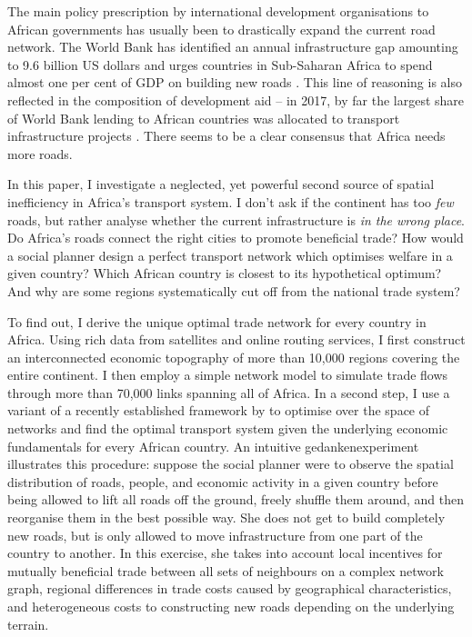 \documentclass[11pt, oneside]{article}   	%
\begin{document}
The main policy prescription by international development organisations to African governments has usually been to drastically expand the current road network. The World Bank has identified an annual infrastructure gap amounting to 9.6 billion US dollars and urges countries in Sub-Saharan Africa to spend almost one per cent of GDP on building new roads \citep{Foster_AfricaInfrastructureTime_2010}. This line of reasoning is also reflected in the composition of development aid -- in 2017, by far the largest share of World Bank lending to African countries was allocated to transport infrastructure projects \citep{TheWorldBank_WorldBankAnnual_2017}. There seems to be a clear consensus that Africa needs more roads.

In this paper, I investigate a neglected, yet powerful second source of spatial inefficiency in Africa's transport system. I don't ask if the continent has too \emph{few} roads, but rather analyse whether the current infrastructure is \emph{in the wrong place}. Do Africa's roads connect the right cities to promote beneficial trade? How would a social planner design a perfect transport network which optimises welfare in a given country? Which African country is closest to its hypothetical optimum? And why are some regions systematically cut off from the national trade system?

To find out, I derive the unique optimal trade network for every country in Africa. Using rich data from satellites and online routing services, I first construct an interconnected economic topography of more than 10,000 regions covering the entire continent. I then employ a simple network model to simulate trade flows through more than 70,000 links spanning all of Africa. In a second step, I use a variant of a recently established framework by \cite{fajgelbaum_optimal_2017} to optimise over the space of networks and find the optimal transport system given the underlying economic fundamentals for every African country. An intuitive gedankenexperiment illustrates this procedure: suppose the social planner were to observe the spatial distribution of roads, people, and economic activity in a given country before being allowed to lift all roads off the ground, freely shuffle them around, and then reorganise them in the best possible way. She does not get to build completely new roads, but is only allowed to move infrastructure from one part of the country to another. In this exercise, she takes into account local incentives for mutually beneficial trade between all sets of neighbours on a complex network graph, regional differences in trade costs caused by geographical characteristics, and heterogeneous costs to constructing new roads depending on the underlying terrain.
\end{document}
